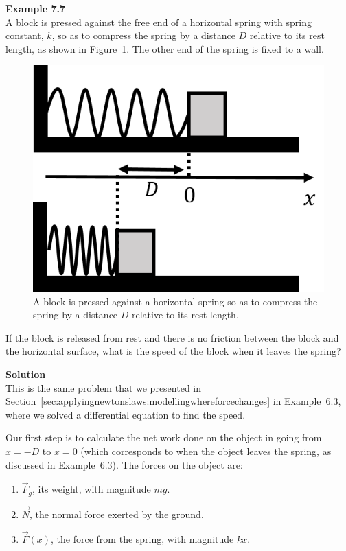 \begin{framed}
\textbf{Example 7.7}\\
A block is pressed against the free end of a horizontal spring with spring constant, $k$, so as to compress the spring by a distance $D$ relative to its rest length, as shown in Figure~\ref{fig:workenergy:spring2}. The other end of the spring is fixed to a wall.

\begin{figure}[!htbp]
\centering
\includegraphics[width=0.4\linewidth]{files/spring-fb0b7b45895ba1ffc941557cc6a32aee.png}
\caption[]{A block is pressed against a horizontal spring so as to compress the spring by a distance $D$ relative to its rest length.}
\label{fig:workenergy:spring2}
\end{figure}

If the block is released from rest and there is no friction between the block and the horizontal surface, what is the speed of the block when it leaves the spring?

\begin{framed}
\textbf{Solution}\\
This is the same problem that we presented in Section~\ref{sec:applyingnewtonslaws:modellingwhereforcechanges} in Example~6.3, where we solved a differential equation to find the speed.

Our first step is to calculate the net work done on the object in going from $x= -D$ to $x=0$ (which corresponds to when the object leaves the spring, as discussed in Example~6.3). The forces on the object are:

\begin{enumerate}
\item $\vec F_g$, its weight, with magnitude $mg$.
\item $\vec N$, the normal force exerted by the ground.
\item $\vec F(x)$, the force from the spring, with magnitude $kx$.
\end{enumerate}


\end{framed}
\end{framed}
